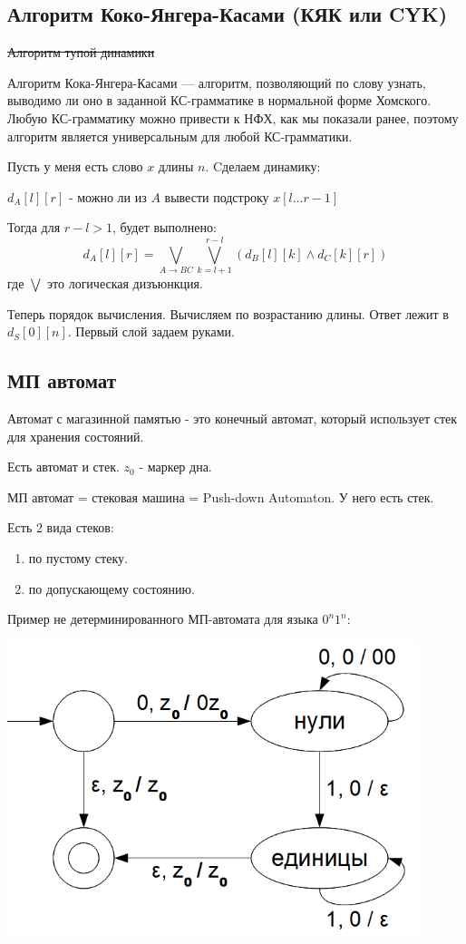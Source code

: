 \subsection{Алгоритм Коко-Янгера-Касами (КЯК или CYK)}

\sout{Алгоритм тупой динамики}

Алгоритм Кока-Янгера-Касами --- алгоритм, позволяющий по слову узнать, выводимо ли оно в заданной КС-грамматике в нормальной форме Хомского. Любую КС-грамматику можно привести к НФХ, как мы показали ранее, поэтому алгоритм является универсальным для любой КС-грамматики.

Пусть у меня есть слово $x$ длины $n$. Cделаем динамику:

$d_A[l][r]$ - можно ли из $A$ вывести подстроку $x[l\ldots r-1]$

Тогда для $r-l >1$, будет выполнено:
$$d_A [l][r] = \bigvee\limits_{A\xrightarrow{} BC} \bigvee\limits_{k=l+1}^{r-l}(d_B[l][k] \wedge d_C[k][r])$$ где $\bigvee$ это логическая дизъюнкция.

Теперь порядок вычисления. Вычисляем по возрастанию длины. Ответ лежит в $d_S[0][n]$. Первый слой задаем руками.

\subsection{МП автомат}

Автомат с магазинной памятью -  это конечный автомат, который использует стек для хранения состояний.

Есть автомат и стек. $z_0$ - маркер дна. 



МП автомат = стековая машина = Push-down Automaton. У него есть стек.

Есть 2 вида стеков:
\begin{enumerate}
    \item по пустому стеку.
    \item по допускающему состоянию.
\end{enumerate}

Пример не детерминированного МП-автомата для языка $0^n1^n$:

\begin{center}
   \includegraphics[width=12cm]{assets/12_3_1.png}
\end{center}